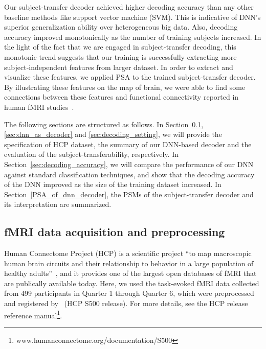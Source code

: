 Our subject-transfer decoder achieved higher decoding accuracy than any
other baseline methods like support vector machine (SVM).
%
This is indicative of DNN's superior generalization ability over heterogeneous big data.
%
Also, decoding accuracy improved monotonically as the number of training subjects increased.
%
In the light of the fact that we are engaged in subject-transfer
decoding, this monotonic trend suggests that our training is
successfully extracting more subject-independent features from larger
dataset.
%
In order to extract and visualize these features, we applied PSA to the
trained subject-transfer decoder.
%
By illustrating these features on the map of brain, we were able to find
some connections between these features and functional connectivity
reported in human fMRI studies~\cite{raichle2001default,raichle2007default,taylor2009two,cole2013multi}.

The following sections are structured as follows.
%
In Section~\ref{sec:fmri_data_specification},
\ref{sec:dnn_as_decoder} and \ref{sec:decoding_setting}, we will provide
the specification of HCP dataset, the summary of our DNN-based decoder
and the evaluation of the subject-transferability, respectively.
%
In Section~\ref{sec:decoding_accuracy}, we will compare the
performance of our DNN against standard classification techniques, and
show that the decoding accuracy of the DNN improved as the size of the
training dataset increased.
%
In Section~\ref{PSA_of_dnn_decoder}, the PSMs of the subject-transfer
decoder and its interpretation are summarized.


\subsection{fMRI data acquisition and preprocessing}
\label{sec:fmri_data_specification}
Human Connectome Project (HCP) is a scientific project ``to map macroscopic human brain circuits and their relationship to behavior in a large population of healthy adults''~\cite{van2013wu}, and it provides one of the largest open databases of fMRI that are publically available today.
%
Here, we used the task-evoked fMRI data collected from 499 participants in Quarter 1 through Quarter 6,
which were  preprocessed and registered by~\cite{van2013wu,glasser2013minimal} (HCP S500 release).
%
For more details, see the HCP release reference manual\footnote{www.humanconnectome.org/documentation/S500}.

